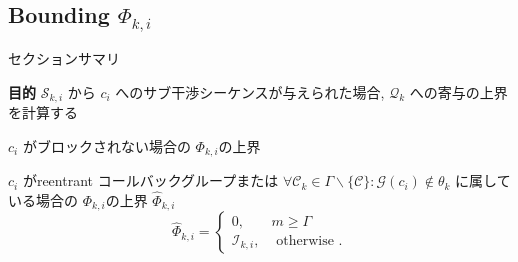 \subsection{Bounding $\Phi_{k, i}$}
\label{ssec: bounding_phi}

\begin{frame}{セクションサマリ}
    \begin{itembox}[l]{\textbf{目的}}
        $\mathcal{S}_{k, i}$ から $c_{i}$ へのサブ干渉シーケンスが与えられた場合, $\mathcal{Q}_{k}$ への寄与の上界を計算する
    \end{itembox}
\end{frame}


\begin{frame}{$c_{i}$ がブロックされない場合の $\Phi_{k, i}$の上界}
    \begin{definition}
        $c_{i}$ がreentrant コールバックグループまたは $\forall \mathcal{C}_{k} \in \Gamma \backslash\{\mathcal{C}\}: \mathcal{G}\left(c_{i}\right) \notin \theta_{k}$ に属している場合の $\Phi_{k, i}$の上界 $\hat{\Phi}_{k, i}$
        \begin{equation*}
            \hat{\Phi}_{k, i}=\left\{\begin{array}{lr}
                0,                  & m \geq \Gamma         \\
                \mathcal{I}_{k, i}, & \text { otherwise } .
            \end{array}\right.
        \end{equation*}
    \end{definition}
\end{frame}

